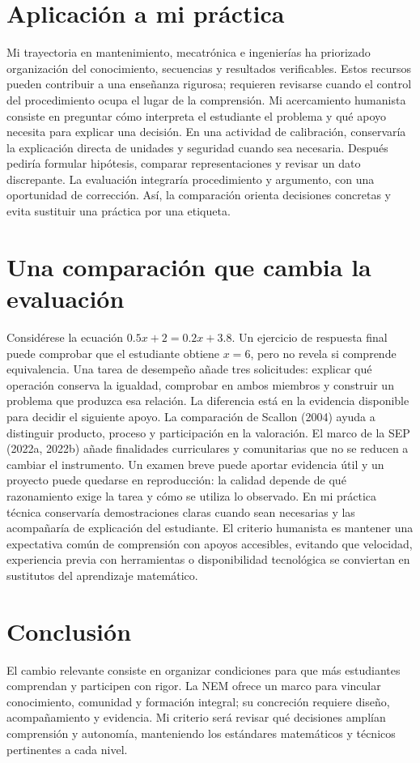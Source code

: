 \documentclass[spanish,letterpaper,oneside]{article}
\begin{document}
\section{Aplicación a mi práctica}
Mi trayectoria en mantenimiento, mecatrónica e ingenierías ha priorizado organización del conocimiento, secuencias y resultados verificables. Estos recursos pueden contribuir a una enseñanza rigurosa; requieren revisarse cuando el control del procedimiento ocupa el lugar de la comprensión. Mi acercamiento humanista consiste en preguntar cómo interpreta el estudiante el problema y qué apoyo necesita para explicar una decisión.
En una actividad de calibración, conservaría la explicación directa de unidades y seguridad cuando sea necesaria. Después pediría formular hipótesis, comparar representaciones y revisar un dato discrepante. La evaluación integraría procedimiento y argumento, con una oportunidad de corrección. Así, la comparación orienta decisiones concretas y evita sustituir una práctica por una etiqueta.
\section{Una comparación que cambia la evaluación}
Considérese la ecuación $0.5x+2=0.2x+3.8$. Un ejercicio de respuesta final puede comprobar que el estudiante obtiene $x=6$, pero no revela si comprende equivalencia. Una tarea de desempeño añade tres solicitudes: explicar qué operación conserva la igualdad, comprobar en ambos miembros y construir un problema que produzca esa relación. La diferencia está en la evidencia disponible para decidir el siguiente apoyo.
La comparación de Scallon (2004) ayuda a distinguir producto, proceso y participación en la valoración. El marco de la SEP (2022a, 2022b) añade finalidades curriculares y comunitarias que no se reducen a cambiar el instrumento. Un examen breve puede aportar evidencia útil y un proyecto puede quedarse en reproducción: la calidad depende de qué razonamiento exige la tarea y cómo se utiliza lo observado.
En mi práctica técnica conservaría demostraciones claras cuando sean necesarias y las acompañaría de explicación del estudiante. El criterio humanista es mantener una expectativa común de comprensión con apoyos accesibles, evitando que velocidad, experiencia previa con herramientas o disponibilidad tecnológica se conviertan en sustitutos del aprendizaje matemático.

\section{Conclusión}
El cambio relevante consiste en organizar condiciones para que más estudiantes comprendan y participen con rigor. La NEM ofrece un marco para vincular conocimiento, comunidad y formación integral; su concreción requiere diseño, acompañamiento y evidencia. Mi criterio será revisar qué decisiones amplían comprensión y autonomía, manteniendo los estándares matemáticos y técnicos pertinentes a cada nivel.
\end{document}
